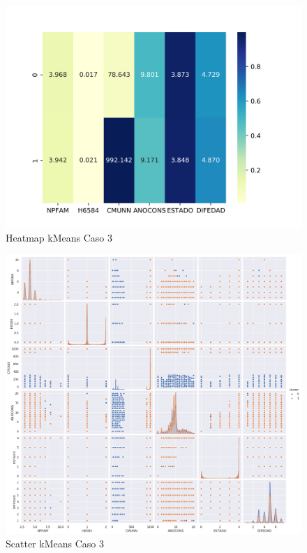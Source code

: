 \begin{figure}[H] %
	\centering
	\includegraphics[scale=0.65]{heatmap-km-3.png}  %
	\caption{Heatmap kMeans Caso 3} 
	\label{fig:hm-km-caso3}
\end{figure}

\begin{figure}[H] %
	\centering
	\includegraphics[scale=0.4]{kmeans-3.png}  %
	\caption{Scatter kMeans Caso 3} 
	\label{fig:sc-km-caso3}
\end{figure}

